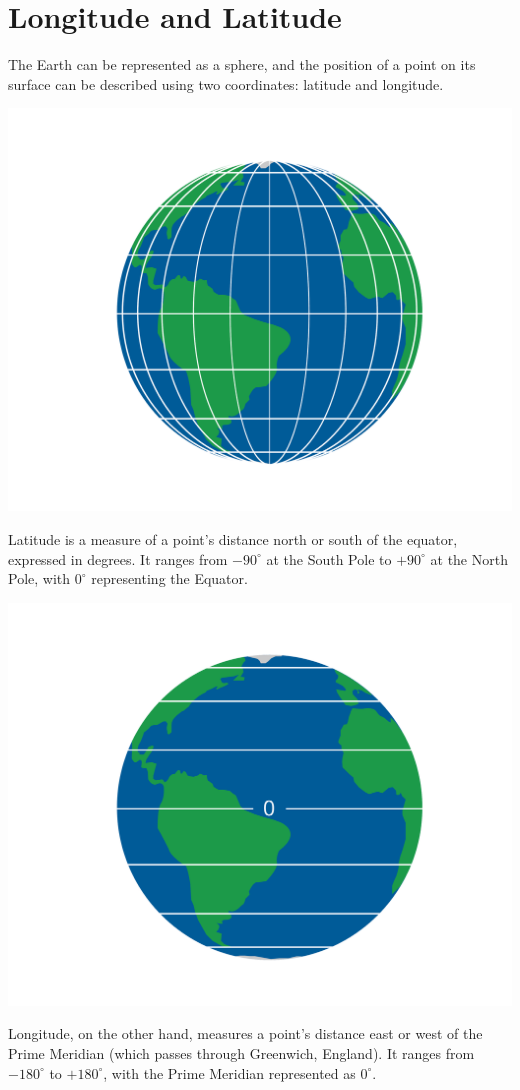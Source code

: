 \chapter{Longitude and Latitude}


The Earth can be represented as a sphere, and the position of a point
on its surface can be described using two coordinates: latitude and
longitude. 

\includegraphics[width=.75\textwidth]{latLon.png}


Latitude is a measure of a point's distance north or south of the
equator, expressed in degrees. It ranges from $-90^{\circ}$ at the
South Pole to $+90^{\circ}$ at the North Pole, with $0^{\circ}$
representing the Equator.

\includegraphics[width=.75\textwidth]{lat.png}

Longitude, on the other hand, measures a point's distance east or west
of the Prime Meridian (which passes through Greenwich, England). It
ranges from $-180^{\circ}$ to $+180^{\circ}$, with the Prime Meridian
represented as $0^{\circ}$.

